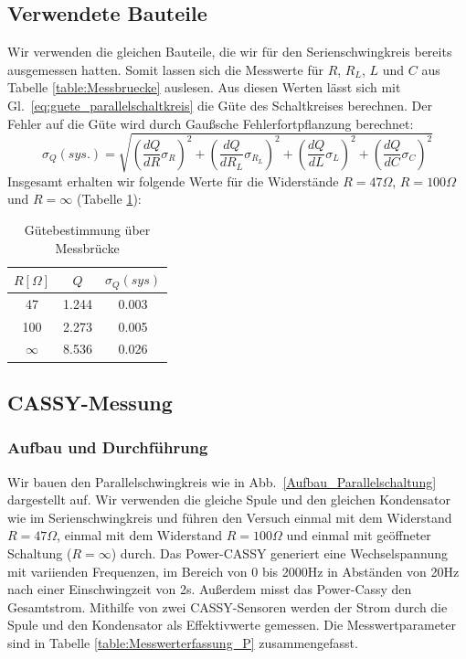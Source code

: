 \documentclass[12pt,a4paper]{article}
\begin{document}
\subsection{Verwendete Bauteile}
Wir verwenden die gleichen Bauteile, die wir für den Serienschwingkreis bereits ausgemessen hatten. Somit lassen sich die Messwerte für $R$, $R_L$, $L$ und $C$ aus Tabelle \ref{table:Messbruecke} auslesen. Aus diesen Werten lässt sich mit Gl.~\eqref{eq:guete_parallelschaltkreis} die Güte des Schaltkreises berechnen. Der Fehler auf die Güte wird durch Gaußsche Fehlerfortpflanzung berechnet:
\begin{equation}
\sigma_Q(sys.)=\sqrt{\left(\frac{dQ}{dR}\sigma_R\right)^2+\left(\frac{dQ}{dR_L}\sigma_{R_L}\right)^2+\left(\frac{dQ}{dL}\sigma_L\right)^2+\left(\frac{dQ}{dC}\sigma_C\right)^2}
\end{equation}
Insgesamt erhalten wir folgende Werte für die Widerstände $R=47\Omega$, $R=100\Omega$ und $R=\infty$ (Tabelle \ref{table:guete_messbruecke_P}):
\begin{table}[H]
	\centering
	\begin{tabular}{|c|c|c|}
		\hline
		$R[\Omega]$&$Q$&$\sigma_Q(sys)$\\
		\hline
		47&1.244&0.003\\
		100&2.273&0.005\\
		$\infty$&8.536&0.026\\
		\hline
	\end{tabular}
	\caption{Gütebestimmung über Messbrücke}
	\label{table:guete_messbruecke_P}
\end{table}

\subsection{CASSY-Messung}
\subsubsection{Aufbau und Durchführung}
Wir bauen den Parallelschwingkreis wie in Abb.~\ref{Aufbau_Parallelschaltung} dargestellt auf. Wir verwenden die gleiche Spule und den gleichen Kondensator wie im Serienschwingkreis und führen den Versuch einmal mit dem Widerstand $R=47\Omega$, einmal mit dem Widerstand $R=100\Omega$ und einmal mit geöffneter Schaltung ($R=\infty$) durch. Das Power-CASSY generiert eine Wechselspannung mit variienden Frequenzen, im Bereich von 0 bis 2000Hz in Abständen von 20Hz nach einer Einschwingzeit von 2s. Außerdem misst das Power-Cassy den Gesamtstrom. Mithilfe von zwei CASSY-Sensoren werden der Strom durch die Spule und den Kondensator als Effektivwerte gemessen. Die Messwertparameter sind in Tabelle \ref{table:Messwerterfassung_P} zusammengefasst.
\end{document}
